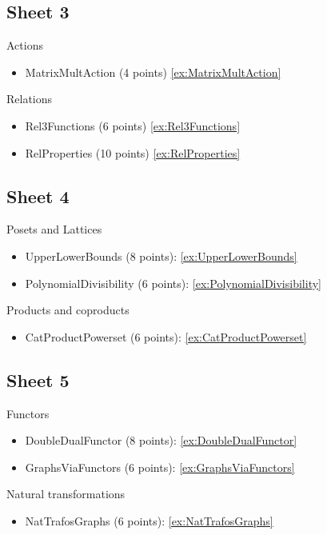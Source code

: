 \subsection{Sheet 3}

Actions
\begin{itemize}
    \item MatrixMultAction (4 points) \cref{ex:MatrixMultAction}
\end{itemize}

Relations
\begin{itemize}
    \item Rel3Functions (6 points) \cref{ex:Rel3Functions}
    \item RelProperties (10 points) \cref{ex:RelProperties}
\end{itemize}

\subsection{Sheet 4}

Posets and Lattices
\begin{itemize}
    \item UpperLowerBounds (8 points): \cref{ex:UpperLowerBounds}
    \item PolynomialDivisibility (6 points):  \cref{ex:PolynomialDivisibility}
\end{itemize}

Products and coproducts
\begin{itemize}
    \item CatProductPowerset (6 points): \cref{ex:CatProductPowerset}
\end{itemize}

\subsection{Sheet 5}

Functors
\begin{itemize}
    \item DoubleDualFunctor (8 points): \cref{ex:DoubleDualFunctor}
    \item GraphsViaFunctors (6 points): \cref{ex:GraphsViaFunctors}
\end{itemize}

Natural transformations
\begin{itemize}
    \item NatTrafosGraphs (6 points): \cref{ex:NatTrafosGraphs}

\end{itemize}

